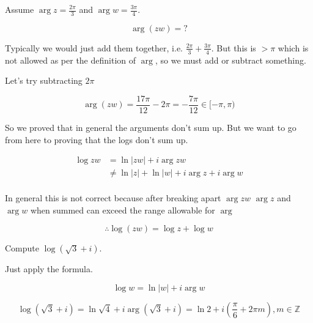 \documentclass[../notes.tex]{subfiles}
\begin{document}
\begin{example}
	Assume $ \arg z = \frac{2\pi}{3}$ and $ \arg w = \frac{3\pi}{4}$. 

	\begin{equation}
		\arg (z w) = ?
	\end{equation}

	Typically we would just add them together, i.e. $ \frac{2\pi}{3} + \frac{3\pi}{4} $.
	But this is $ > \pi $ which is not allowed as per the definition of $ \arg $, so we must add or subtract something.

	Let's try subtracting $ 2\pi $ 

	\begin{equation}
		\arg (zw) = \frac{17\pi}{12} - 2\pi  =  -\frac{7\pi}{12} \in [-\pi, \pi) 
	\end{equation}

	So we proved that in general the arguments don't sum up. But we want to go from here to proving that the logs don't sum up.


	\begin{equation}
		\begin{split}
			\log zw &= \ln |zw| + i \arg zw  \\
			 &\neq  \ln |z| + \ln |w| + i \arg z + i \arg w \\
		\end{split}
	\end{equation}

	In general this is not correct because after breaking apart $ \arg zw $ $ \arg z $ and $ \arg w $ when summed can exceed the range allowable for $ \arg $ 

	\begin{equation}
		\therefore \log(zw) = \log z + \log w
	\end{equation}
\end{example}

\begin{example}
	Compute $ \log(\sqrt{3} + i ) $.

	Just apply the formula.

	\begin{equation}
		\log w = \ln |w| + i \arg w
	\end{equation}

	\begin{equation}
		 \log(\sqrt{3} + i )  = \ln \sqrt{4}  + i \arg (\sqrt{3} + i) = \ln 2 + i(\frac{\pi}{6} + 2\pi m), m \in \mathbb{Z} 
	\end{equation}
	
\end{example}
\end{document}
